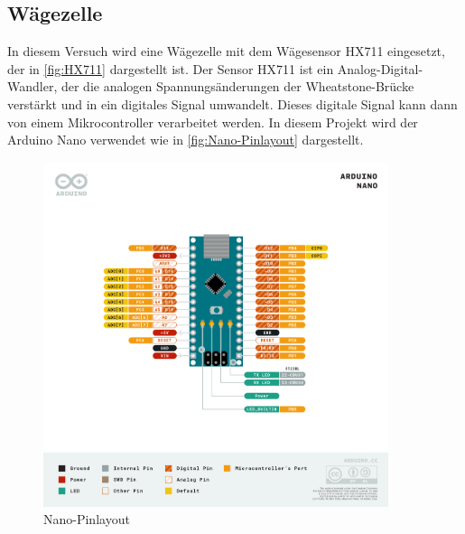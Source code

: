 \subsection{Wägezelle}

In diesem Versuch wird eine Wägezelle mit dem Wägesensor HX711 eingesetzt, der in \autoref{fig:HX711} dargestellt ist.
Der Sensor HX711 ist ein Analog-Digital-Wandler, der die analogen Spannungsänderungen der Wheatstone-Brücke verstärkt und in ein digitales Signal umwandelt.
Dieses digitale Signal kann dann von einem Mikrocontroller verarbeitet werden.
In diesem Projekt wird der Arduino Nano verwendet wie in \autoref{fig:Nano-Pinlayout} dargestellt.
\begin{figure}[h!]
    \centering
    \includegraphics[width=0.9\textwidth]{img/Nano-Pinlayout.png}
    \caption{Nano-Pinlayout \cite{Arduino}}
    \label{fig:Nano-Pinlayout}
\end{figure}

